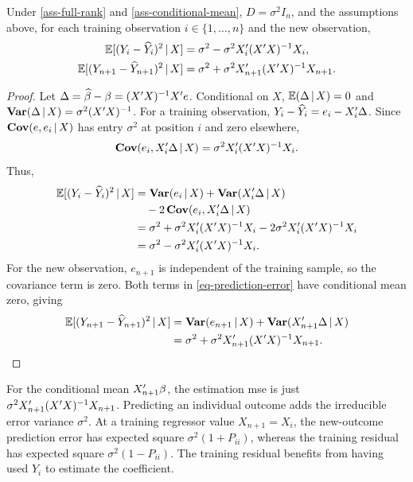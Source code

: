 \documentclass[a4paper,12pt]{article}
\begin{document}
\begin{proposition}
	Under \autoref{ass-full-rank} and \ref{ass-conditional-mean}, $D=\sigma^2 I_n$, and the assumptions above,
	for each training observation $i\in\{1,\ldots,n\}$ and the new observation,
	\begin{align}\label{eq-prediction-mse}
		\operatorname{\mathbb{E}}[(Y_i-\widehat Y_i)^2\mathpunct{}|\mathpunct{} X] &= \sigma^2-\sigma^2X_i^{\prime}(X^{\prime} X)^{-1} X_i,\\
		\operatorname{\mathbb{E}}[(Y_{n+1}-\widehat Y_{n+1})^2\mathpunct{}|\mathpunct{} X] &= \sigma^2+\sigma^2X_{n+1}^{\prime}(X^{\prime} X)^{-1} X_{n+1}.
	\end{align}
\end{proposition}
\begin{proof}
	Let $\Delta=\widehat\beta-\beta=(X^{\prime} X)^{-1} X^{\prime} e$.
	Conditional on $X$, $\operatorname{\mathbb{E}}(\Delta\mathpunct{}|\mathpunct{} X)=0$ and
	$\operatorname{\text{\textrm{\upshape\textbf{Var}}}}(\Delta\mathpunct{}|\mathpunct{} X)=\sigma^2(X^{\prime} X)^{-1}$.
	For a training observation, $Y_i-\widehat Y_i=e_i-X_i^{\prime}\Delta$.
	Since $\operatorname{\text{\textrm{\upshape\textbf{Cov}}}}(e,e_i\mathpunct{}|\mathpunct{} X)$ has entry $\sigma^2$ at position $i$ and zero elsewhere,
	\begin{align*}
		\operatorname{\text{\textrm{\upshape\textbf{Cov}}}}(e_i,X_i^{\prime}\Delta\mathpunct{}|\mathpunct{} X)
		=\sigma^2X_i^{\prime}(X^{\prime} X)^{-1} X_i.
	\end{align*}
	Thus,
	\begin{align*}
		\operatorname{\mathbb{E}}[(Y_i-\widehat Y_i)^2\mathpunct{}|\mathpunct{} X]
		&=\operatorname{\text{\textrm{\upshape\textbf{Var}}}}(e_i\mathpunct{}|\mathpunct{} X)+\operatorname{\text{\textrm{\upshape\textbf{Var}}}}(X_i^{\prime}\Delta\mathpunct{}|\mathpunct{} X)\\
		&\quad-2\operatorname{\text{\textrm{\upshape\textbf{Cov}}}}(e_i,X_i^{\prime}\Delta\mathpunct{}|\mathpunct{} X)\\
		&=\sigma^2+\sigma^2X_i^{\prime}(X^{\prime} X)^{-1} X_i
		-2\sigma^2X_i^{\prime}(X^{\prime} X)^{-1} X_i\\
		&=\sigma^2-\sigma^2X_i^{\prime}(X^{\prime} X)^{-1} X_i.
	\end{align*}
	For the new observation, $e_{n+1}$ is independent of the training sample, so the covariance term is zero.
	Both terms in \eqref{eq-prediction-error} have conditional mean zero, giving
	\begin{align*}
		\operatorname{\mathbb{E}}[(Y_{n+1}-\widehat Y_{n+1})^2\mathpunct{}|\mathpunct{} X]
		&=\operatorname{\text{\textrm{\upshape\textbf{Var}}}}(e_{n+1}\mathpunct{}|\mathpunct{} X)+\operatorname{\text{\textrm{\upshape\textbf{Var}}}}(X_{n+1}^{\prime}\Delta\mathpunct{}|\mathpunct{} X)\\
		&=\sigma^2+\sigma^2X_{n+1}^{\prime}(X^{\prime} X)^{-1} X_{n+1}.
		\qedhere
	\end{align*}
\end{proof}

\begin{remark}
	For the conditional mean $X_{n+1}^{\prime}\beta$, the estimation \gls{mse} is just
	$\sigma^2X_{n+1}^{\prime}(X^{\prime} X)^{-1} X_{n+1}$.
	Predicting an individual outcome adds the irreducible error variance $\sigma^2$.
	At a training regressor value $X_{n+1}=X_i$, the new-outcome prediction error has expected square $\sigma^2(1+P_{ii})$,
	whereas the training residual has expected square $\sigma^2(1-P_{ii})$.
	The training residual benefits from having used $Y_i$ to estimate the coefficient.
\end{remark}
\end{document}
